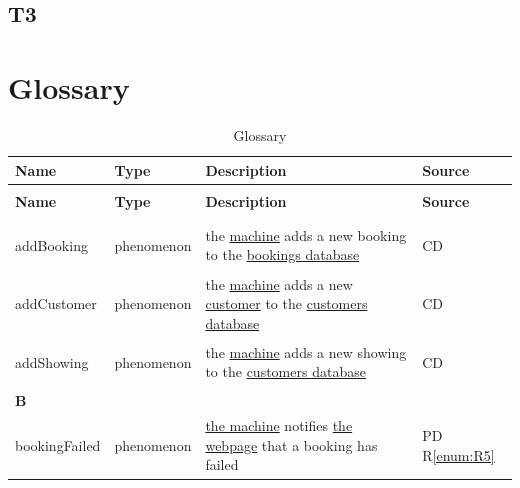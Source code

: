 \documentclass[a4paper,10pt,titlepage,bibtotoc,bibtotocnumbered]{scrreprt}
\begin{document}
\section{T3}




\chapter{Glossary}

\begin{longtable}{|l|p{3cm}|p{5cm}|l|}
\caption{Glossary}
\label{table:glossar}\\
\hline
\rowcolor{black!25}\textbf{Name} & \textbf{Type} & \textbf{Description} & \textbf{Source}\\
\hline
\endfirsthead
\caption[]{Glossary}\\
\hline
\rowcolor{black!25}\textbf{Name} & \textbf{Type} & \textbf{Description} & \textbf{Source}\\
\endhead
\hline
\endfoot
\multicolumn{4}{|l|}{\textbf{A}}\\
\hline
\hypertarget{glossary:addBooking}{addBooking} & phenomenon & the \hyperlink{glossary:UDEKino}{machine} adds a new booking to the \hyperlink{glossary:BookingsDatabase}{bookings database} & CD\\
\hline
\hypertarget{glossary:addCustomer}{addCustomer} & phenomenon & the \hyperlink{glossary:UDEKino}{machine} adds a new \hyperlink{glossary:Customer}{customer} to the \hyperlink{glossary:CustomersDatabase}{customers database} & CD\\
\hline
\hypertarget{glossary:addShowing}{addShowing} & phenomenon & the \hyperlink{glossary:UDEKino}{machine} adds a new showing to the \hyperlink{glossary:ShowingsDatabase}{customers database} & CD\\
\hline
\multicolumn{4}{|l|}{\textbf{B}}\\
\hline
\hypertarget{glossary:bookingFailed}{bookingFailed} & phenomenon & \hyperlink{glossary:UDEKino}{the machine} notifies \hyperlink{glossary:WebpageBookTickets}{the webpage} that a booking has failed & PD R\ref{enum:R5}\\

\end{longtable}
\end{document}
